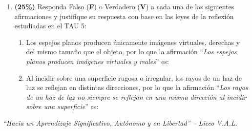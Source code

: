 \documentclass[11pt, letterpaper]{article}
\begin{document}
\begin{enumerate}[leftmargin=*, itemsep=0.8cm]
\begin{center}
		\end{center}
		
		
		
		\item \textbf{(25\%)}
		Responda Falso (\textbf{F}) o Verdadero (\textbf{V}) a cada una de las siguientes afirmaciones y justifique su respuesta con base en las leyes de la reflexión estudiadas en el TAU 5:
		
		\begin{enumerate}[label=\alph*.), itemsep=0.4cm]
			\item Los espejos planos producen únicamente imágenes virtuales, derechas y del mismo tamaño que el objeto, por lo que la afirmación ``\textit{Los espejos planos producen imágenes virtuales y reales}'' es: \underline{\hspace{1.5cm}} \\
			
			
			\item Al incidir sobre una superficie rugosa o irregular, los rayos de un haz de luz se reflejan en distintas direcciones, por lo que la afirmación ``\textit{Los rayos de un haz de luz no siempre se reflejan en una misma dirección al incidir sobre una superficie}'' es: \underline{\hspace{1.5cm}} \\
			
		\end{enumerate}
		
		
		
	\end{enumerate}
	
	\vfill
	\begin{center}
		\textit{\color{valdark!70} ``Hacia un Aprendizaje Significativo, Autónomo y en Libertad'' -- Liceo V.A.L.}
	\end{center}
	
\end{document}

